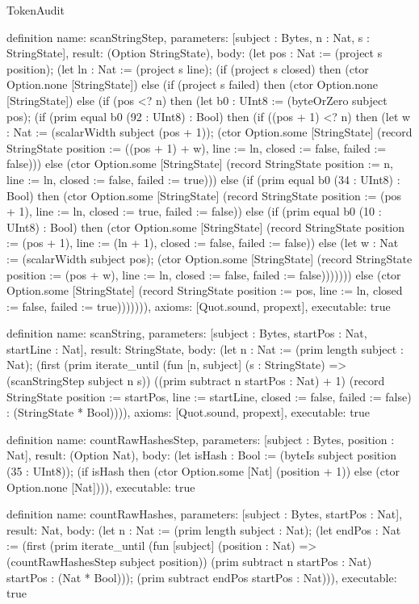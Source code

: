 \begin{lexlean}{TokenAudit}
\begin{semanticmodule}
definition{
  name: scanStringStep,
  parameters: [subject : Bytes, n : Nat, s : StringState],
  result: (Option StringState),
  body: (let pos : Nat := (project s position); (let ln : Nat := (project s line); (if (project s closed) then (ctor Option.none [StringState]) else (if (project s failed) then (ctor Option.none [StringState]) else (if (pos <? n) then (let b0 : UInt8 := (byteOrZero subject pos); (if (prim equal b0 (92 : UInt8) : Bool) then (if ((pos + 1) <? n) then (let w : Nat := (scalarWidth subject (pos + 1)); (ctor Option.some [StringState] (record StringState {position := ((pos + 1) + w), line := ln, closed := false, failed := false}))) else (ctor Option.some [StringState] (record StringState {position := n, line := ln, closed := false, failed := true}))) else (if (prim equal b0 (34 : UInt8) : Bool) then (ctor Option.some [StringState] (record StringState {position := (pos + 1), line := ln, closed := true, failed := false})) else (if (prim equal b0 (10 : UInt8) : Bool) then (ctor Option.some [StringState] (record StringState {position := (pos + 1), line := (ln + 1), closed := false, failed := false})) else (let w : Nat := (scalarWidth subject pos); (ctor Option.some [StringState] (record StringState {position := (pos + w), line := ln, closed := false, failed := false}))))))) else (ctor Option.some [StringState] (record StringState {position := pos, line := ln, closed := false, failed := true}))))))),
  axioms: [Quot.sound, propext],
  executable: true
}

definition{
  name: scanString,
  parameters: [subject : Bytes, startPos : Nat, startLine : Nat],
  result: StringState,
  body: (let n : Nat := (prim length subject : Nat); (first (prim iterate_until (fun [n, subject] (s : StringState) => (scanStringStep subject n s)) ((prim subtract n startPos : Nat) + 1) (record StringState {position := startPos, line := startLine, closed := false, failed := false}) : (StringState * Bool)))),
  axioms: [Quot.sound, propext],
  executable: true
}

definition{
  name: countRawHashesStep,
  parameters: [subject : Bytes, position : Nat],
  result: (Option Nat),
  body: (let isHash : Bool := (byteIs subject position (35 : UInt8)); (if isHash then (ctor Option.some [Nat] (position + 1)) else (ctor Option.none [Nat]))),
  executable: true
}

definition{
  name: countRawHashes,
  parameters: [subject : Bytes, startPos : Nat],
  result: Nat,
  body: (let n : Nat := (prim length subject : Nat); (let endPos : Nat := (first (prim iterate_until (fun [subject] (position : Nat) => (countRawHashesStep subject position)) (prim subtract n startPos : Nat) startPos : (Nat * Bool))); (prim subtract endPos startPos : Nat))),
  executable: true
}


\end{semanticmodule}
\end{lexlean}
